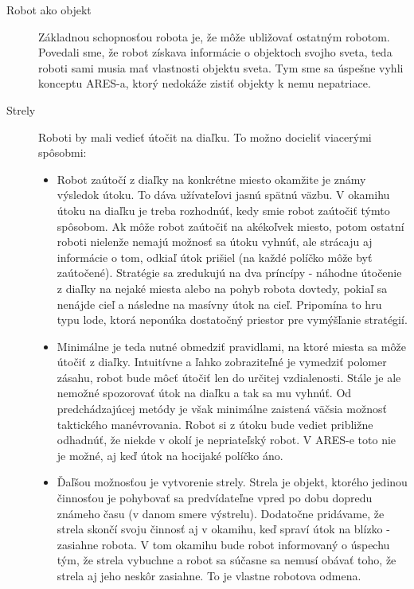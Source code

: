 \begin{description}
\item[Robot ako objekt]\hfill \newline %
Základnou schopnosťou robota je, že môže ubližovať ostatným robotom. Povedali sme, že robot získava informácie o objektoch svojho sveta, teda roboti sami musia mať vlastnosti objektu sveta. Tym sme sa úspešne vyhli konceptu ARES-a, ktorý nedokáže zistiť objekty k nemu nepatriace.
\newline
\item[Strely] \hfill %
\newline %
Roboti by mali vedieť útočit na diaľku. To možno docieliť viacerými spôsobmi:
\begin{itemize}
\item Robot zaútočí z diaľky na konkrétne miesto okamžite je známy výsledok útoku. To dáva užívateľovi jasnú spätnú väzbu. V okamihu útoku na diaľku je treba rozhodnúť, kedy smie robot zaútočiť týmto spôsobom. Ak môže robot zaútočiť na akékoľvek miesto, potom ostatní roboti nielenže nemajú možnosť sa útoku vyhnúť, ale strácaju aj informácie o tom, odkiaľ útok prišiel (na každé políčko môže byť zaútočené). Stratégie sa zredukujú na dva príncípy - náhodne útočenie z diaľky na nejaké miesta alebo na pohyb robota dovtedy, pokiaľ sa nenájde cieľ a následne na masívny útok na cieľ. Pripomína to hru typu lode, ktorá neponúka dostatočný priestor pre vymýšľanie stratégií. \\ %
\item Minimálne je teda nutné obmedziť pravidlami, na ktoré miesta sa môže útočiť z diaľky. Intuitívne a ľahko zobraziteľné je vymedziť polomer zásahu, robot bude môcť útočiť len do určitej vzdialenosti. Stále je ale nemožné spozorovať útok na diaľku a tak sa mu vyhnúť.  Od predchádzajúcej metódy je však minimálne zaistená väčsia možnosť taktického manévrovania. Robot si z útoku bude vediet približne odhadnúť, že niekde v okolí je nepriateľský robot. V ARES-e toto nie je možné, aj keď útok na hocijaké políčko áno.
\item Ďaľšou možnosťou je vytvorenie strely. Strela je objekt, ktorého jedinou činnosťou je pohybovať sa predvídateľne vpred po dobu dopredu známeho času  (v danom smere výstrelu). Dodatočne pridávame, že strela skončí svoju činnosť aj v okamihu, keď spraví útok na blízko - zasiahne robota. V tom okamihu bude robot informovaný o úspechu tým, že strela vybuchne a robot sa súčasne sa nemusí obávať toho, že strela aj jeho neskôr zasiahne. To je vlastne robotova odmena. %

\end{itemize}
\end{description}
